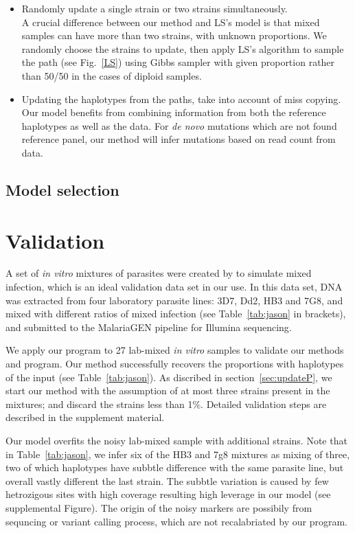 \documentclass{bioinfo}
\begin{document}
\begin{methods}
\begin{itemize}
\item Randomly update a single strain or two strains simultaneously.\\
A crucial difference between our method and LS's model is that mixed samples can have more than two strains, with unknown proportions. We randomly choose the strains to update, then apply LS's algorithm to sample the path (see Fig.~\ref{LS}) using Gibbs sampler with given proportion rather than 50/50 in the cases of diploid samples.
\item Updating the haplotypes from the paths, take into account of miss copying. Our model benefits from combining information from both the reference haplotypes as well as the data. For {\em de novo} mutations which are not found reference panel, our method will infer mutations based on read count from data.


\end{itemize}


\subsection{Model selection}

\section{Validation}
A set of {\it in vitro} mixtures of parasites were created by \citet{Wendler2015} to simulate mixed infection, which is an ideal validation data set in our use. In this data set, DNA was extracted from four laboratory parasite lines: 3D7, Dd2, HB3 and 7G8, and mixed with different ratios of mixed infection (see Table~\ref{tab:jason} in brackets), and submitted to the MalariaGEN pipeline \citep{MalariaGen2008} for Illumina sequencing.


We apply our program to 27 lab-mixed {\em in vitro} samples to validate our methods and program. Our method successfully recovers the proportions with haplotypes of the input (see Table~\ref{tab:jason}). As discribed in section~\ref{sec:updateP}, we start our method with the assumption of at most three strains present in the mixtures; and discard the strains less than 1\%. Detailed validation steps are described in the supplement material.

Our model overfits the noisy lab-mixed sample with additional strains. Note that in Table~\ref{tab:jason}, we infer six of the HB3 and 7g8 mixtures as mixing of three, two of which haplotypes have subbtle difference with the same parasite line, but overall vastly different the last strain. The subbtle variation is caused by few hetrozigous sites with high coverage resulting high leverage in our model (see supplemental Figure). The origin of the noisy markers are possibily from sequncing or variant calling process, which are not recalabriated by our program.


\end{methods}
\end{document}
